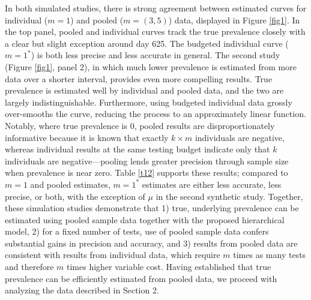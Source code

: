 \documentclass{article}
\begin{document}
In both simulated studies, there is strong agreement between estimated curves for individual ($m=1$) and pooled ($m=(3,5)$) data, displayed in Figure \ref{fig1}. In the top panel, pooled and individual curves track the true prevalence closely with a clear but slight exception around day 625. The budgeted individual curve ($m=1^*$) is both less precise and less accurate in general. The second study (Figure \ref{fig1}, panel 2), in which much lower prevalence is estimated from more data over a shorter interval, provides even more compelling results. True prevalence is estimated well by individual and pooled data, and the two are largely indistinguishable. Furthermore, using budgeted individual data grossly over-smooths the curve, reducing the process to an approximately linear function. Notably, where true prevalence is 0, pooled results are disproportionately informative because it is known that exactly $k\times m$ individuals are negative, whereas individual results at the same testing budget indicate only that $k$ individuals are negative—pooling lends greater precision through sample size when prevalence is near zero. Table \ref{t12} supports these results; compared to $m=1$ and pooled estimates, $m=1^*$ estimates are either less accurate, less precise, or both, with the exception of $\mu$ in the second synthetic study. Together, these simulation studies demonstrate that 1) true, underlying prevalence can be estimated using pooled sample data together with the proposed hierarchical model, 2) for a fixed number of tests, use of pooled sample data confers substantial gains in precision and accuracy, and 3) results from pooled data are consistent with results from individual data, which require $m$ times as many tests and therefore $m$ times higher variable cost. Having established that true prevalence can be efficiently estimated from pooled data, we proceed with analyzing the data described in Section 2.
\end{document}
